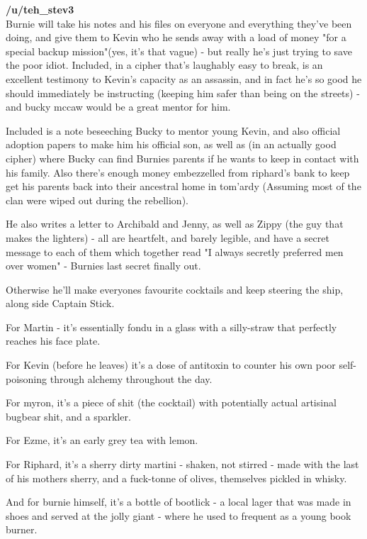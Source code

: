 \textbf{/u/teh\_stev3}\\
Burnie will take his notes and his files on everyone and everything they've been doing, and give them to Kevin who he sends away with a load of money "for a special backup mission"(yes, it's that vague) - but really he's just trying to save the poor idiot. Included, in a cipher that's laughably easy to break, is an excellent testimony to Kevin's capacity as an assassin, and in fact he's so good he should immediately be instructing (keeping him safer than being on the streets) - and bucky mccaw would be a great mentor for him.\medskip

Included is a note beseeching Bucky to mentor young Kevin, and also official adoption papers to make him his official son, as well as (in an actually good cipher) where Bucky can find Burnies parents if he wants to keep in contact with his family. Also there's enough money embezzelled from riphard's bank to keep get his parents back into their ancestral home in tom'ardy (Assuming most of the clan were wiped out during the rebellion).\medskip

He also writes a letter to Archibald and Jenny, as well as Zippy (the guy that makes the lighters) - all are heartfelt, and barely legible, and have a secret message to each of them which together read "I always secretly preferred men over women" - Burnies last secret finally out.\medskip

Otherwise he'll make everyones favourite cocktails and keep steering the ship, along side Captain Stick.\medskip

For Martin - it's essentially fondu in a glass with a silly-straw that perfectly reaches his face plate.\medskip

For Kevin (before he leaves) it's a dose of antitoxin to counter his own poor self-poisoning through alchemy throughout the day.\medskip

For myron, it's a piece of shit (the cocktail) with potentially actual artisinal bugbear shit, and a sparkler.\medskip

For Ezme, it's an early grey tea with lemon.\medskip

For Riphard, it's a sherry dirty martini - shaken, not stirred - made with the last of his mothers sherry, and a fuck-tonne of olives, themselves pickled in whisky.\medskip

And for burnie himself, it's a bottle of bootlick - a local lager that was made in shoes and served at the jolly giant - where he used to frequent as a young book burner.\medskip

